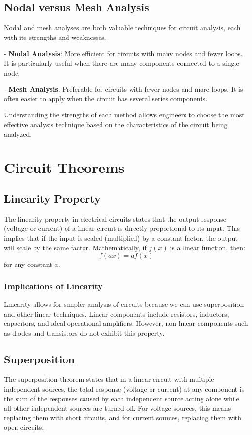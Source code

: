 \documentclass[openany]{book}
\begin{document}
\section{Nodal versus Mesh Analysis}
Nodal and mesh analyses are both valuable techniques for circuit analysis, each with its strengths and weaknesses. 

- \textbf{Nodal Analysis}: More efficient for circuits with many nodes and fewer loops. It is particularly useful when there are many components connected to a single node.

- \textbf{Mesh Analysis}: Preferable for circuits with fewer nodes and more loops. It is often easier to apply when the circuit has several series components.

Understanding the strengths of each method allows engineers to choose the most effective analysis technique based on the characteristics of the circuit being analyzed.

\chapter{Circuit Theorems}

\section{Linearity Property}
The linearity property in electrical circuits states that the output response (voltage or current) of a linear circuit is directly proportional to its input. This implies that if the input is scaled (multiplied) by a constant factor, the output will scale by the same factor. Mathematically, if \(f(x)\) is a linear function, then:
\[
f(ax) = af(x)
\]
for any constant \(a\).

\subsection{Implications of Linearity}
Linearity allows for simpler analysis of circuits because we can use superposition and other linear techniques. Linear components include resistors, inductors, capacitors, and ideal operational amplifiers. However, non-linear components such as diodes and transistors do not exhibit this property.

\section{Superposition}
The superposition theorem states that in a linear circuit with multiple independent sources, the total response (voltage or current) at any component is the sum of the responses caused by each independent source acting alone while all other independent sources are turned off. For voltage sources, this means replacing them with short circuits, and for current sources, replacing them with open circuits.
\end{document}
